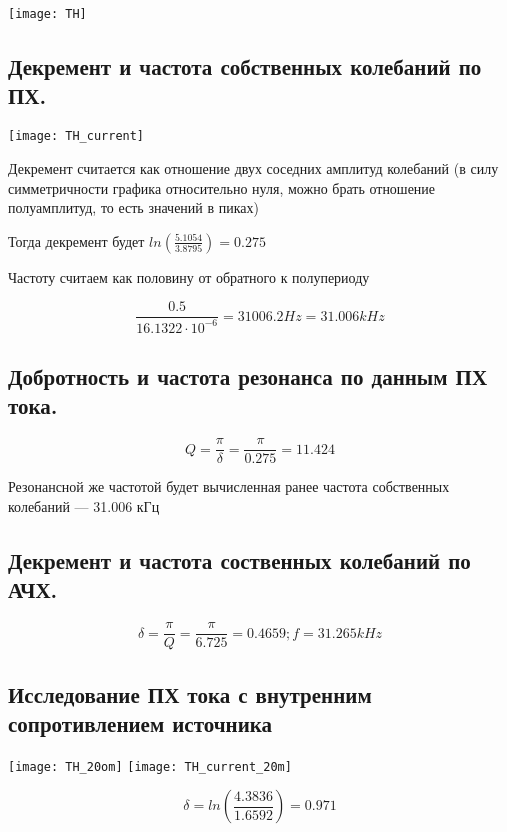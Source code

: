 \documentclass[12pt,a4paper]{article}
\begin{document}
			\texttt{[image: TH]}

		\newpage
		
		\subsection{Декремент и частота собственных колебаний по ПХ.\newline}
		
			\texttt{[image: TH\_current]}
			
			Декремент считается как отношение двух соседних амплитуд колебаний (в силу симметричности графика относительно нуля, можно брать отношение полуамплитуд, то есть значений в пиках)
			
			Тогда декремент будет $ln\left(\frac{5.1054}{3.8795}\right) = 0.275$

			Частоту считаем как половину от обратного к полупериоду
			
			\[\frac{0.5}{16.1322 \cdot 10^{-6}} = 31006.2 Hz = 31.006 kHz\]
			
		\subsection{Добротность и частота резонанса по данным ПХ тока.\newline}
			
			\[Q = \frac{\pi}{\delta} = \frac{\pi}{0.275} = 11.424\]
			
			Резонансной же частотой будет вычисленная ранее частота собственных колебаний --- 31.006 кГц
			
		\subsection{Декремент и частота соственных колебаний по АЧХ.\newline}
		
			\[\delta = \frac{\pi}{Q} = \frac{\pi}{6.725} = 0.4659; f = 31.265 kHz\]
			
		\subsection{Исследование ПХ тока с внутренним сопротивлением источника\newline}
		
			\texttt{[image: TH\_20om]}
			\texttt{[image: TH\_current\_20m]}
			
			\[\delta = ln\left(\frac{4.3836}{1.6592}\right) = 0.971\]
			
\end{document}
